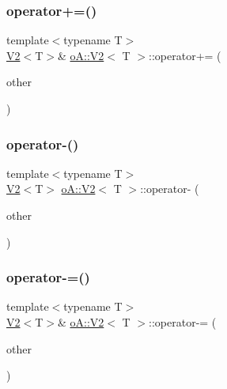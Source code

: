 \mbox{\label{structo_a_1_1_v2_ab5f783ae5cda46636a17dda5bc552a13}} 
\subsubsection{\texorpdfstring{operator+=()}{operator+=()}}
{\footnotesize\ttfamily template$<$typename T$>$ \\
\mbox{\hyperlink{structo_a_1_1_v2}{V2}}$<$T$>$\& \mbox{\hyperlink{structo_a_1_1_v2}{o\+A\+::\+V2}}$<$ T $>$\+::operator+= (\begin{DoxyParamCaption}\item[{const \mbox{\hyperlink{structo_a_1_1_v2}{o\+A\+::\+V2}}$<$ T $>$ \&}]{other }\end{DoxyParamCaption})\hspace{0.3cm}{\ttfamily [inline]}}

\mbox{\label{structo_a_1_1_v2_af1a6777d0bae8bbe2aeee4f15da03162}} 
\subsubsection{\texorpdfstring{operator-\/()}{operator-()}}
{\footnotesize\ttfamily template$<$typename T$>$ \\
\mbox{\hyperlink{structo_a_1_1_v2}{V2}}$<$T$>$ \mbox{\hyperlink{structo_a_1_1_v2}{o\+A\+::\+V2}}$<$ T $>$\+::operator-\/ (\begin{DoxyParamCaption}\item[{const \mbox{\hyperlink{structo_a_1_1_v2}{o\+A\+::\+V2}}$<$ T $>$ \&}]{other }\end{DoxyParamCaption})\hspace{0.3cm}{\ttfamily [inline]}}

\mbox{\label{structo_a_1_1_v2_a6e33681639974e51d66db212b7fcddbc}} 
\subsubsection{\texorpdfstring{operator-\/=()}{operator-=()}}
{\footnotesize\ttfamily template$<$typename T$>$ \\
\mbox{\hyperlink{structo_a_1_1_v2}{V2}}$<$T$>$\& \mbox{\hyperlink{structo_a_1_1_v2}{o\+A\+::\+V2}}$<$ T $>$\+::operator-\/= (\begin{DoxyParamCaption}\item[{const \mbox{\hyperlink{structo_a_1_1_v2}{o\+A\+::\+V2}}$<$ T $>$ \&}]{other }\end{DoxyParamCaption})\hspace{0.3cm}{\ttfamily [inline]}}

